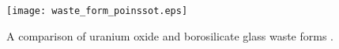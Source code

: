 \begin{figure}[htbp!]
  \begin{center}
    \texttt{[image: waste\_form\_poinssot.eps]}
  \end{center}
  \caption{A comparison of uranium oxide and borosilicate glass waste forms 
  \cite{poinssot_long-term_2012}.}
  \label{fig:waste_form_poinssot}
\end{figure}
